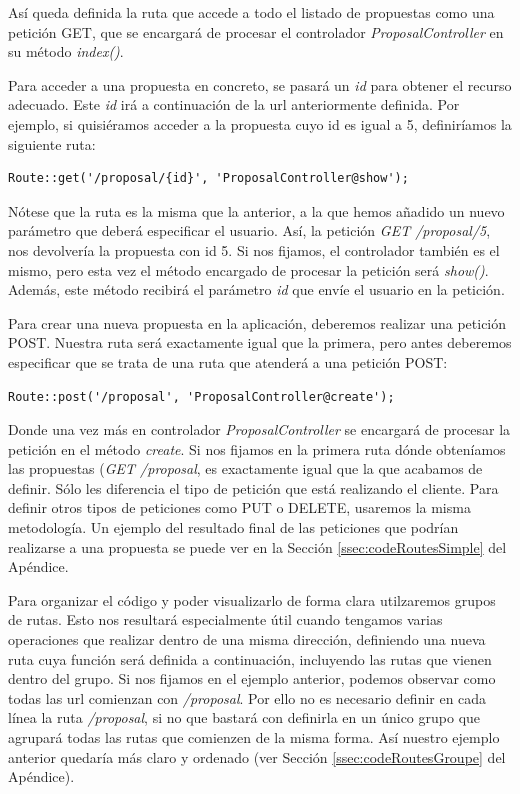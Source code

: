 Así queda definida la ruta que accede a todo el listado de propuestas como una petición GET, que se encargará de procesar el controlador \textit{ProposalController} en su método \textit{index()}.

Para acceder a una propuesta en concreto, se pasará un \textit{id} para obtener el recurso adecuado. Este \textit{id} irá a continuación de la url anteriormente definida. Por ejemplo, si quisiéramos acceder a la propuesta cuyo id es igual a 5, definiríamos la siguiente ruta:

\lstset{
  language        = php}
  \begin{lstlisting}[frame=single]	
Route::get('/proposal/{id}', 'ProposalController@show');
\end{lstlisting}

Nótese que la ruta es la misma que la anterior, a la que hemos añadido un nuevo parámetro que deberá especificar el usuario. Así, la petición \textit{GET /proposal/5}, nos devolvería la propuesta con id 5. Si nos fijamos, el controlador también es el mismo, pero esta vez el método encargado de procesar la petición será \textit{show()}. Además, este método recibirá el parámetro \textit{{id}} que envíe el usuario en la petición.

Para crear una nueva propuesta en la aplicación, deberemos realizar una petición POST. Nuestra ruta será exactamente igual que la primera, pero antes deberemos especificar que se trata de una ruta que atenderá a una petición POST:

\lstset{
  language        = php}
\begin{lstlisting}[frame=single]	
Route::post('/proposal', 'ProposalController@create');
\end{lstlisting}

Donde una vez más en controlador \textit{ProposalController} se encargará de procesar la petición en el método \textit{create}. Si nos fijamos en la primera ruta dónde obteníamos las propuestas (\textit{GET /proposal}, es exactamente igual que la que acabamos de definir. Sólo les diferencia el tipo de petición que está realizando el cliente. Para definir otros tipos de peticiones como PUT o DELETE, usaremos la misma metodología. Un ejemplo del resultado final de las peticiones que podrían realizarse a una propuesta se puede ver en la Sección \ref{ssec:codeRoutesSimple} del Apéndice.

Para organizar el código y poder visualizarlo de forma clara utilzaremos grupos de rutas. Esto nos resultará especialmente útil cuando tengamos varias operaciones que realizar dentro de una misma dirección, definiendo una nueva ruta cuya función será definida a continuación, incluyendo las rutas que vienen dentro del grupo. Si nos fijamos en el ejemplo anterior, podemos observar como todas las url comienzan con \textit{/proposal}. Por ello no es necesario definir en cada línea la ruta \textit{/proposal}, si no que bastará con definirla en un único grupo que agrupará todas las rutas que comienzen de la misma forma. Así nuestro ejemplo anterior quedaría más claro y ordenado (ver Sección \ref{ssec:codeRoutesGroupe} del Apéndice).

